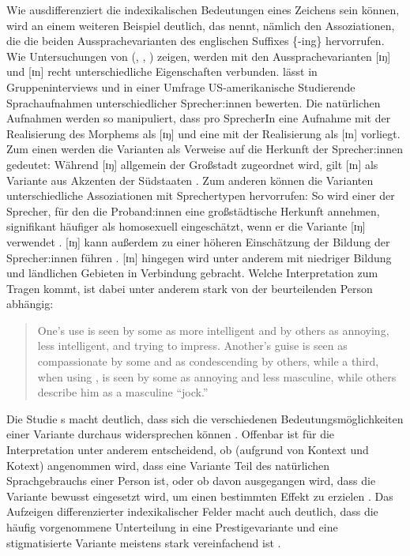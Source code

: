 \begin{sloppypar}
Wie ausdifferenziert die indexikalischen Bedeutungen eines Zeichens sein können, wird an einem weiteren Beispiel deutlich, das \citet[465--466]{Eckert2008} nennt, nämlich den Assoziationen, die die beiden Aussprachevarianten des englischen Suffixes \{-ing\}  hervorrufen. 
Wie Untersuchungen von \citeauthor{CampbellKibler.2007} (\citeyear{CampbellKibler.2005}, \citeyear{CampbellKibler.2007}, \citeyear{CampbellKibler.2008}) zeigen, werden mit den Aussprachevarianten [ɪŋ] und [ɪn] recht unterschiedliche Eigenschaften verbunden. 
\citet{CampbellKibler.2007} lässt in Gruppeninterviews und in einer Umfrage US-amerikanische  Studierende Sprachaufnahmen unterschiedlicher Sprecher:innen bewerten. 
Die natürlichen Aufnahmen werden so manipuliert, dass pro SprecherIn eine Aufnahme mit der Realisierung des Morphems als [ɪŋ] und eine mit der Realisierung als [ɪn] vorliegt. 
Zum einen werden die Varianten als Verweise auf die Herkunft der Sprecher:innen gedeutet: Während [ɪŋ] allgemein der Großstadt zugeordnet wird, gilt [ɪn] als Variante aus Akzenten der Südstaaten \citep[s.][]{CampbellKibler.2007}. 
Zum anderen können die Varianten unterschiedliche Assoziationen mit Sprechertypen hervorrufen: So wird einer der Sprecher, für den die Proband:innen eine großstädtische Herkunft annehmen, signifikant häufiger als homosexuell eingeschätzt, wenn er die Variante [ɪŋ] verwendet \citep[s.][50]{CampbellKibler.2007}. 
[ɪŋ] kann außerdem zu einer höheren Einschätzung der Bildung der Sprecher:innen führen \citep[s.][46--47]{CampbellKibler.2007}. 
[ɪn] hingegen wird unter anderem mit niedriger Bildung und ländlichen Gebieten in Verbindung gebracht. 
Welche Interpretation zum Tragen kommt, ist dabei unter anderem stark von der beurteilenden Person abhängig: 
\end{sloppypar}

\begin{quote} One’s  use is seen by some as more intelligent and by others as annoying, less intelligent, and trying to impress. Another’s  guise is seen as compassionate by some and as condescending by others, while a third, when using , is seen by some as annoying and less masculine, while others describe him as a masculine “jock.” \citep[637]{CampbellKibler.2008} \end{quote}
Die Studie \citeauthor{CampbellKibler.2008}s macht deutlich, dass sich die verschiedenen Bedeutungsmöglichkeiten einer Variante durchaus widersprechen können \citep[vgl. auch][93--94]{Jaffe.2016}. 
Offenbar ist für die Interpretation unter anderem entscheidend, ob (aufgrund von Kontext und Kotext) angenommen wird, dass eine Variante Teil des \glqq natürlichen\grqq{} Sprachgebrauchs einer Person ist, oder ob davon ausgegangen wird, dass die Variante bewusst eingesetzt wird, um einen bestimmten Effekt zu erzielen \citep[s.][640]{CampbellKibler.2008}. 
Das Aufzeigen differenzierter indexikalischer Felder macht auch deutlich, dass die häufig vorgenommene Unterteilung in eine {Pres\-tige\-variante} und eine stigmatisierte Variante meistens stark vereinfachend ist \citep[s.][226]{Eckert2004}. 

